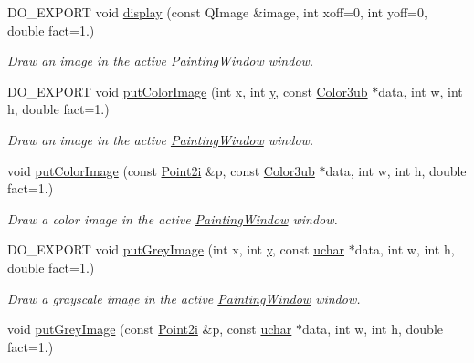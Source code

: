 \begin{DoxyCompactItemize}
D\-O\-\_\-\-E\-X\-P\-O\-R\-T void \hyperlink{group___draw2_d_ga21ef0ec97c68ddfe1610831f9abad05a}{display} (const Q\-Image \&image, int xoff=0, int yoff=0, double fact=1.)
\begin{DoxyCompactList}\small\item\em Draw an image in the active \hyperlink{class_d_o_1_1_painting_window}{Painting\-Window} window. \end{DoxyCompactList}\item 
D\-O\-\_\-\-E\-X\-P\-O\-R\-T void \hyperlink{group___draw2_d_ga88a29cdb7128f7420a377be1a920ad26}{put\-Color\-Image} (int x, int \hyperlink{group___channel_accessors_gac90c52c5b3a7b2a7e3761e6e84f25778}{y}, const \hyperlink{group___color_types_ga018b76cd00a4f9dca7dd06246d5bd3aa}{Color3ub} $\ast$data, int w, int h, double fact=1.)
\begin{DoxyCompactList}\small\item\em Draw an image in the active \hyperlink{class_d_o_1_1_painting_window}{Painting\-Window} window. \end{DoxyCompactList}\item 
void \hyperlink{group___draw2_d_gad6d58648ab2826b1840c473af1565680}{put\-Color\-Image} (const \hyperlink{group___eigen_typedefs_ga048a27763e58f682b1b91af86144f701}{Point2i} \&p, const \hyperlink{group___color_types_ga018b76cd00a4f9dca7dd06246d5bd3aa}{Color3ub} $\ast$data, int w, int h, double fact=1.)
\begin{DoxyCompactList}\small\item\em Draw a color image in the active \hyperlink{class_d_o_1_1_painting_window}{Painting\-Window} window. \end{DoxyCompactList}\item 
D\-O\-\_\-\-E\-X\-P\-O\-R\-T void \hyperlink{group___draw2_d_ga902ff77325fc9064fe57a1c31a11fc2d}{put\-Grey\-Image} (int x, int \hyperlink{group___channel_accessors_gac90c52c5b3a7b2a7e3761e6e84f25778}{y}, const \hyperlink{group___eigen_typedefs_ga65f85814a8290f9797005d3b28e7e5fc}{uchar} $\ast$data, int w, int h, double fact=1.)
\begin{DoxyCompactList}\small\item\em Draw a grayscale image in the active \hyperlink{class_d_o_1_1_painting_window}{Painting\-Window} window. \end{DoxyCompactList}\item 
void \hyperlink{group___draw2_d_ga4ccda4964985ca1bc9d143345d2fd75f}{put\-Grey\-Image} (const \hyperlink{group___eigen_typedefs_ga048a27763e58f682b1b91af86144f701}{Point2i} \&p, const \hyperlink{group___eigen_typedefs_ga65f85814a8290f9797005d3b28e7e5fc}{uchar} $\ast$data, int w, int h, double fact=1.)

\end{DoxyCompactItemize}
